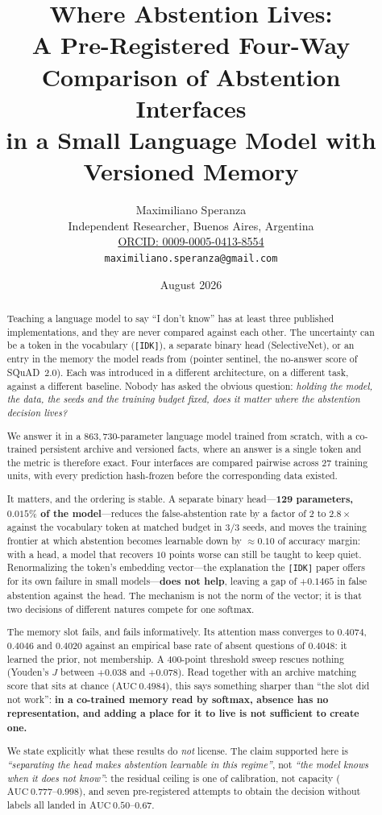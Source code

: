 \documentclass[11pt,a4paper]{article}
\title{\bfseries Where Abstention Lives:\\
A Pre-Registered Four-Way Comparison of Abstention Interfaces\\
in a Small Language Model with Versioned Memory}
\author{Maximiliano Speranza\\
\small Independent Researcher, Buenos Aires, Argentina\\
\small \href{https://orcid.org/0009-0005-0413-8554}{ORCID: 0009-0005-0413-8554}\\
\small \texttt{maximiliano.speranza@gmail.com}}
\date{August 2026}
\begin{document}
\maketitle

\begin{abstract}
\noindent
Teaching a language model to say ``I don't know'' has at least three published implementations, and
they are never compared against each other. The uncertainty can be a token in the vocabulary
(\texttt{[IDK]}), a separate binary head (SelectiveNet), or an entry in the memory the model reads
from (pointer sentinel, the no-answer score of SQuAD~2.0). Each was introduced in a different
architecture, on a different task, against a different baseline. Nobody has asked the obvious
question: \emph{holding the model, the data, the seeds and the training budget fixed, does it matter
where the abstention decision lives?}

We answer it in a $863{,}730$-parameter language model trained from scratch, with a co-trained
persistent archive and versioned facts, where an answer is a single token and the metric is
therefore exact. Four interfaces are compared pairwise across 27 training units, with every
prediction hash-frozen before the corresponding data existed.

It matters, and the ordering is stable. A separate binary head---\textbf{129 parameters, $0.015\%$
of the model}---reduces the false-abstention rate by a factor of $2$ to $2.8\times$ against the
vocabulary token at matched budget in $3/3$ seeds, and moves the training frontier at which
abstention becomes learnable down by $\approx 0.10$ of accuracy margin: with a head, a model that
recovers $10$ points worse can still be taught to keep quiet. Renormalizing the token's embedding
vector---the explanation the \texttt{[IDK]} paper offers for its own failure in small
models---\textbf{does not help}, leaving a gap of $+0.1465$ in false abstention against the head.
The mechanism is not the norm of the vector; it is that two decisions of different natures compete
for one softmax.

The memory slot fails, and fails informatively. Its attention mass converges to $0.4074$, $0.4046$
and $0.4020$ against an empirical base rate of absent questions of $0.4048$: it learned the prior, not
membership. A $400$-point threshold sweep rescues nothing (Youden's $J$ between $+0.038$ and
$+0.078$). Read together with an archive matching score that sits at chance ($\mathrm{AUC}\ 0.4984$),
this says something sharper than ``the slot did not work'': \textbf{in a co-trained memory read by
softmax, absence has no representation, and adding a place for it to live is not sufficient to
create one.}

We state explicitly what these results do \emph{not} license. The claim supported here is
\emph{``separating the head makes abstention learnable in this regime''}, not \emph{``the model knows
when it does not know''}: the residual ceiling is one of calibration, not capacity
($\mathrm{AUC}\ 0.777$--$0.998$), and seven pre-registered attempts to obtain the decision without
labels all landed in $\mathrm{AUC}\ 0.50$--$0.67$.
\end{abstract}
\end{document}

